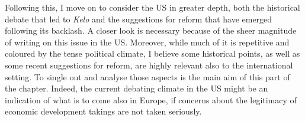 \documentclass[12pt,a4paper]{book} %
\begin{document}
Following this, I move on to consider the US in greater depth, both the historical debate that led to {\it Kelo} and the suggestions for reform that have emerged following its backlash. A closer look is necessary because of the sheer magnitude of writing on this issue in the US. Moreover, while much of it is repetitive and coloured by the tense political climate, I believe some historical points, as well as some recent suggestions for reform, are highly relevant also to the international setting. To single out and analyse those aspects is the main aim of this part of the chapter. Indeed, the current debating climate in the US might be an indication of what is to come also in Europe, if concerns about the legitimacy of economic development takings are not taken seriously.

%

\end{document}
